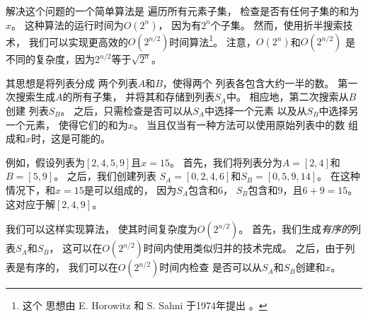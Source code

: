 解决这个问题的一个简单算法是
遍历所有元素子集，
检查是否有任何子集的和为$x$。
这种算法的运行时间为$O(2^n)$，
因为有$2^n$个子集。
然而，使用折半搜索技术，
我们可以实现更高效的$O(2^{n/2})$时间算法\footnote{这个
思想由 E. Horowitz 和 S. Sahni 于1974年提出 \cite{hor74}。}。
注意，$O(2^n)$和$O(2^{n/2})$
是不同的复杂度，因为$2^{n/2}$等于$\sqrt{2^n}$。

其思想是将列表分成
两个列表$A$和$B$，使得两个
列表各包含大约一半的数。
第一次搜索生成$A$的所有子集，
并将其和存储到列表$S_A$中。
相应地，第二次搜索从$B$创建
列表$S_B$。
之后，只需检查是否可以从$S_A$中选择一个元素
以及从$S_B$中选择另一个元素，
使得它们的和为$x$。
当且仅当有一种方法可以使用原始列表中的数
组成和$x$时，这是可能的。

例如，假设列表为$[2,4,5,9]$且$x=15$。
首先，我们将列表分为$A=[2,4]$和$B=[5,9]$。
之后，我们创建列表
$S_A=[0,2,4,6]$和$S_B=[0,5,9,14]$。
在这种情况下，和$x=15$是可以组成的，
因为$S_A$包含和$6$，
$S_B$包含和$9$，且$6+9=15$。
这对应于解$[2,4,9]$。

我们可以这样实现算法，
使其时间复杂度为$O(2^{n/2})$。
首先，我们生成\emph{有序的}列表$S_A$和$S_B$，
这可以在$O(2^{n/2})$时间内使用类似归并的技术完成。
之后，由于列表是有序的，
我们可以在$O(2^{n/2})$时间内检查
是否可以从$S_A$和$S_B$创建和$x$。